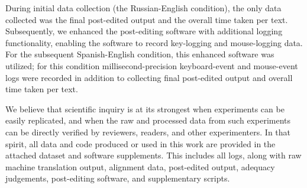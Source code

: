 During initial data collection (the Russian-English condition), the only data collected was the final post-edited output and the overall time taken per text.
%
Subsequently, we enhanced the post-editing software with additional logging functionality, enabling the software to record key-logging and mouse-logging data.
%
For the subsequent Spanish-English condition, this enhanced software was utilized; for this condition millisecond-precision keyboard-event and mouse-event logs were recorded in addition to collecting final post-edited output and overall time taken per text.

We believe that scientific inquiry is at its strongest when experiments can be easily replicated, and when the raw and processed data from such experiments can be directly verified by reviewers, readers, and other experimenters.
%
In that spirit, all data and code produced or used in this work are provided in the attached dataset and software supplements.
%
This includes all logs, along with raw machine translation output, alignment data, post-edited output, adequacy judgements, post-editing software, and supplementary scripts.



